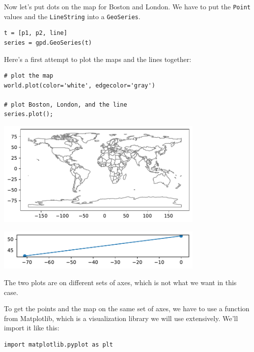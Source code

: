 Now let's put dots on the map for Boston and London. We have to put the
\passthrough{\lstinline!Point!} values and the
\passthrough{\lstinline!LineString!} into a
\passthrough{\lstinline!GeoSeries!}.

\begin{lstlisting}[]
t = [p1, p2, line]
series = gpd.GeoSeries(t)
\end{lstlisting}

Here's a first attempt to plot the maps and the lines together:

\begin{lstlisting}[]
# plot the map
world.plot(color='white', edgecolor='gray')

# plot Boston, London, and the line
series.plot();
\end{lstlisting}

\begin{center}
\includegraphics[width=4in]{chapters/02_times_files/02_times_126_0.pdf}
\end{center}

\begin{center}
\includegraphics[width=4in]{chapters/02_times_files/02_times_126_1.pdf}
\end{center}

The two plots are on different sets of axes, which is not what we want in this
case.

To get the points and the map on the same set of axes, we have to use a
function from Matplotlib, which is a visualization library we will use
extensively. We'll import it like this:

\begin{lstlisting}[]
import matplotlib.pyplot as plt
\end{lstlisting}

